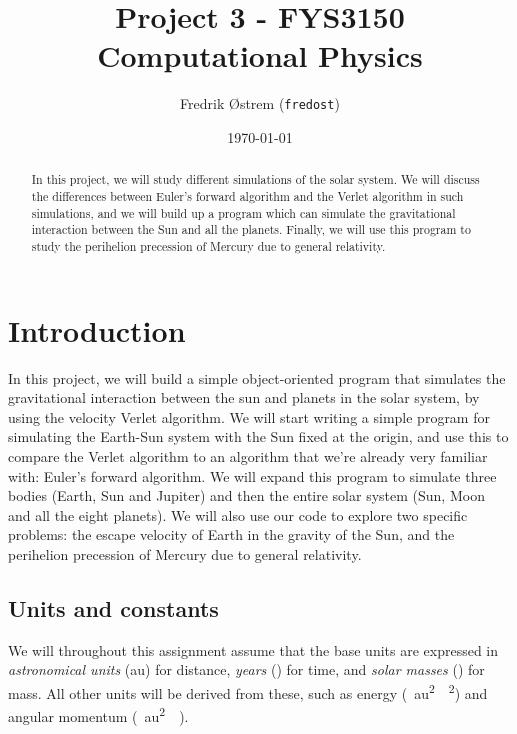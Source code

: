 \documentclass[11pt,a4paper]{article}
\begin{document}
\title{Project 3 - FYS3150 Computational Physics}
\author{Fredrik Østrem (\texttt{fredost})}
\date{\today}

\maketitle

\begin{abstract}
  In this project, we will study different simulations of the solar system. We will discuss the differences between Euler's forward algorithm and the Verlet algorithm
  in such simulations, and we will build up a program which can simulate the gravitational interaction between the Sun and all the planets. Finally, we will use this program to
  study the perihelion precession of Mercury due to general relativity.
\end{abstract}

\tableofcontents

\clearpage
\section{Introduction}
In this project, we will build a simple object-oriented program that simulates the gravitational interaction between the sun and planets in the solar system, by using the velocity Verlet
algorithm. We will start writing a simple program for simulating the Earth-Sun system with the Sun fixed at the origin, and use this to compare the Verlet algorithm to an algorithm
that we're already very familiar with: Euler's forward algorithm. We will expand this program to simulate three bodies (Earth, Sun and Jupiter) and then the entire solar system (Sun, Moon
and all the eight planets). We will also use our code to explore two specific problems: the escape velocity of Earth in the gravity of the Sun, and the perihelion precession of Mercury due to
general relativity.

\subsection{Units and constants}

We will throughout this assignment assume that the base units are expressed in \emph{astronomical units} (\si{\astronomicalunit}) for distance, \emph{years} (\si{\year}) for time, and \emph{solar masses} (\si{\solarmass}) for mass. All other units will be derived from these, such as energy (\si{\solarmass \astronomicalunit^2 \per \year^2}) and angular momentum (\si{\solarmass \astronomicalunit^2 \per \year}).
\end{document}
